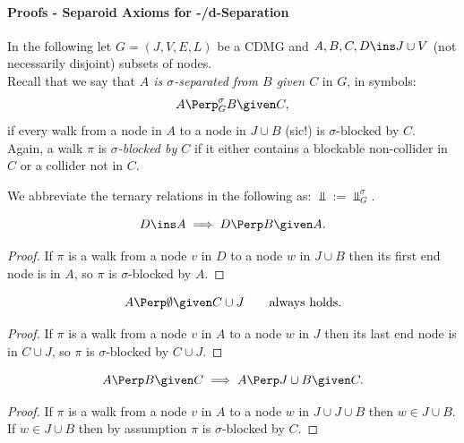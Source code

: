 \paragraph{Proofs - Separoid Axioms for \textsigma-/d-Separation}\hfill%

In the following let $G=(J,V,E,L)$ be a CDMG and $A,B,C,D \ins J \cup V$
(not necessarily disjoint) subsets of nodes.\\

Recall that we say that \emph{$A$ is $\sigma$-separated from $B$ given $C$} in $G$, in symbols:
    \[ A \Perp^\sigma_G B \given C, \]
 if every walk from a node in $A$ to a node in $J \cup B$ (sic!) is $\sigma$-blocked by $C$. \\
 Again, a walk $\pi$ is \emph{$\sigma$-blocked by $C$} if it either contains a blockable non-collider in $C$ or a collider not in $C$.

 We abbreviate the ternary relations in the following as: $\displaystyle \Perp := \Perp_G^\sigma$.


\begin{Lem}
    \[D \ins A \implies D \Perp  B \given A.\]
\begin{proof}
    If $\pi$ is a walk from a node $v$ in $D$ to a node $w$ in $J \cup B$ then its first end node is in $A$, so $\pi$ is $\sigma$-blocked by $A$.
\end{proof}
\end{Lem}

\begin{Lem}
    \label{s-sep-restricted-right-redundancy}
    \[A \Perp  \emptyset \given C \cup J \qquad \text{always holds.}\]
\begin{proof}
    If $\pi$ is a walk from a node $v$ in $A$ to a node $w$ in $J$ then its last end node is in $C \cup J$, so $\pi$ is $\sigma$-blocked by $C \cup J$.
\end{proof}
\end{Lem}


\begin{Lem}
    \[A \Perp  B \given C \implies A \Perp  J \cup B \given C.\]
\begin{proof}
 If $\pi$ is a walk from a node $v$ in $A$ to a node $w$ in $J \cup J \cup B$ then $w \in J \cup B$. %
 If $w \in J \cup B$ then by assumption $\pi$ is $\sigma$-blocked by $C$.
\end{proof}
\end{Lem}

